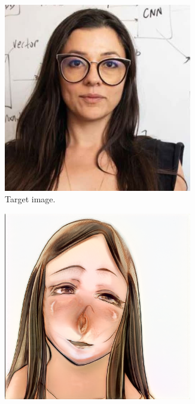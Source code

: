 \documentclass[conference]{IEEEtran}
\theoremstyle{definition}
\theoremstyle{remark}
\theoremstyle{remark}
\begin{document}
\begin{figure}
  \centering
  \begin{subfigure}[b]{0.15\textwidth}
    \centering \includegraphics[width=0.9\textwidth]{figs/anime-olga-0.png}
    \caption{Target image.}
  \end{subfigure}
  \begin{subfigure}[b]{0.15\textwidth}
    \centering \includegraphics[width=0.9\textwidth]{figs/anime-olga-1.png}

\end{subfigure}
\end{figure}
\end{document}
